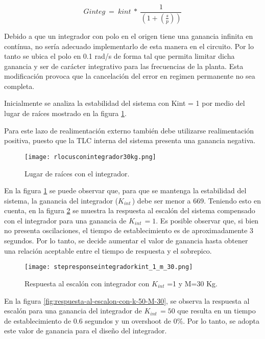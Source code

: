 \[Ginteg\ =\ kint\ *\ \frac{1}{(1+(\frac{s}{p}))}\]

\noindent Debido a que un integrador con polo en el origen tiene una ganancia infinita en contínua, no sería adecuado implementarlo de esta manera en el circuito. Por lo tanto se ubica el polo en 0.1 rad/s de forma tal que permita limitar dicha ganancia y ser de carácter integrativo para las frecuencias de la planta. Esta modificación provoca que la cancelación del error en regimen permanente no sea completa.


Inicialmente se analiza la estabilidad del sistema con Kint = 1 por medio del lugar de raíces mostrado en la figura \ref{fig:lugar-de-raices-con-integrador-analog}.

\noindent Para este lazo de realimentación externo también debe utilizarse realimentación positiva, puesto que la TLC interna del sistema presenta una ganancia negativa.


\begin{figure}[H]
	\centering
	\texttt{[image: rlocusconintegrador30kg.png]}
	\caption{Lugar de raíces con el integrador.}
	\label{fig:lugar-de-raices-con-integrador-analog}
\end{figure}

\noindent En la figura \ref{fig:lugar-de-raices-con-integrador-analog} se puede observar que, para que se mantenga la estabilidad del sistema, la ganancia del integrador ($K_{int\ }$) debe ser menor a 669. Teniendo esto en cuenta, en la figura \ref{fig:respuesta-al-escalon-con-k-1-M-30-analog} se muestra la respuesta al escal\'{o}n del sistema compensado con el integrador para una ganancia de $K_{int\ }=1$.  Es posible observar que, si bien no presenta oscilaciones, el tiempo de establecimiento es de aproximadamente 3 segundos. Por lo tanto, se decide aumentar el valor de ganancia hasta obtener una relaci\'{o}n aceptable entre el tiempo de respuesta y el sobrepico.

\begin{figure}[H]
	\centering
	\texttt{[image: stepresponseintegradorkint\_1\_m\_30.png]}
	\caption{Respuesta al escalón con integrador con $K_{int}$ =1 y M=30 Kg.}
	\label{fig:respuesta-al-escalon-con-k-1-M-30-analog}
\end{figure}

\noindent En la figura \ref{fig:respuesta-al-escalon-con-k-50-M-30}, se observa la respuesta al escal\'{o}n para una ganancia del integrador de $K_{int\ }=50$ que resulta en un tiempo de establecimiento de 0.6 segundos y un overshoot de 0\%. Por lo tanto, se adopta este valor de ganancia para el dise\~{n}o del integrador.

